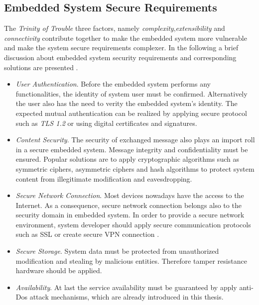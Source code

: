 \subsection{Embedded System Secure Requirements}
The \emph{Trinity of Trouble} \cite{embedded_secure} three factors, namely \emph{complexity},\emph{extensibility} and \emph{connectivity} contribute together to make the embedded system more vulnerable and make the  system secure requirements complexer.
In the following a brief discussion about embedded system security requirements and corresponding solutions are presented \cite{embedded_secure}.
\begin{itemize}
\item \emph{User Authentication}. Before the embedded system performs any functionalities, the identity of system user must be confirmed. Alternatively the user also has the need to verity the embedded system's identity. The expected mutual authentication can be realized by applying secure protocol such as \emph{TLS 1.2} or using digital certificates and signatures.
\item \emph{Content Security}. The security of exchanged message also plays an import roll in a secure embedded system. Message integrity and confidentiality must be ensured. Popular solutions are to apply cryptographic algorithms such as symmetric ciphers, asymmetric ciphers and hash algorithms to protect system content from illegitimate modification and eavesdropping.
\item \emph{Secure Network Connection}. Most devices nowadays have the access to the Internet. As a consequence, secure  network connection belongs also to the security domain in embedded system. In order  to provide a secure network environment, system developer should apply secure communication protocols such as SSL or create secure VPN connection \cite{embedded_secure}.
\item \emph{Secure Storage}. System data must be protected from unauthorized modification and stealing by malicious entities. Therefore tamper resistance hardware should be applied.
\item \emph{Availability}. At last the service availability must be guaranteed by apply anti-Dos attack mechanisms, which are already introduced in this thesis.
\end{itemize}
